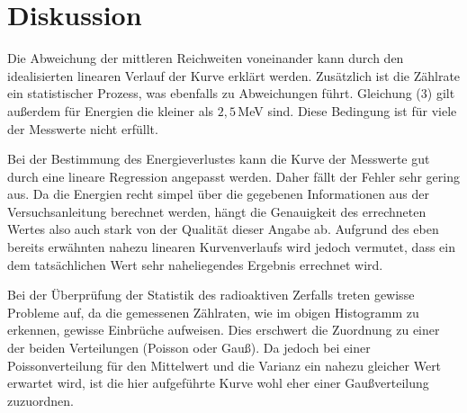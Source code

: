 \section{Diskussion}
\label{sec:Diskussion}

Die Abweichung der mittleren Reichweiten voneinander kann durch den idealisierten linearen Verlauf der Kurve erklärt werden. Zusätzlich ist
die Zählrate ein statistischer Prozess, was ebenfalls zu Abweichungen führt. Gleichung (3) gilt außerdem für Energien die kleiner als
$2,5\,$MeV sind. Diese Bedingung ist für viele der Messwerte nicht erfüllt.

Bei der Bestimmung des Energieverlustes kann die Kurve der Messwerte gut durch eine lineare Regression angepasst werden. Daher fällt der Fehler
sehr gering aus. Da die Energien recht simpel über die gegebenen Informationen aus der Versuchsanleitung \cite{sample} berechnet werden, hängt
die Genauigkeit des errechneten Wertes also auch stark von der Qualität dieser Angabe ab. Aufgrund des eben bereits erwähnten nahezu linearen
Kurvenverlaufs wird jedoch vermutet, dass ein dem tatsächlichen Wert sehr naheliegendes Ergebnis errechnet wird.

Bei der Überprüfung der Statistik des radioaktiven Zerfalls treten gewisse Probleme auf, da die gemessenen Zählraten, wie im obigen Histogramm zu
erkennen, gewisse Einbrüche aufweisen. Dies erschwert die Zuordnung zu einer der beiden Verteilungen (Poisson oder Gauß). Da jedoch bei einer
Poissonverteilung für den Mittelwert und die Varianz ein nahezu gleicher Wert erwartet wird, ist die hier aufgeführte Kurve wohl eher einer
Gaußverteilung zuzuordnen.
